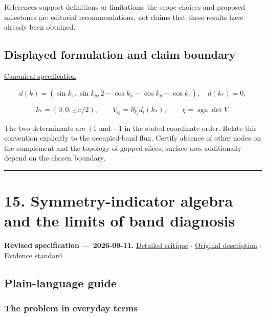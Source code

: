 \documentclass[
  11pt,
]{article}
\begin{document}
References support definitions or limitations; the scope choices and
proposed milestones are editorial recommendations, not claims that these
results have already been obtained.

\subsection{Displayed formulation and claim boundary}

\href{https://github.com/rick-stevens-ai/Pure-Thought/blob/main/PRDs/14-Topological-Semimetals-Weyl-Dirac.md}{Canonical
specification}.

\[d(k)=(\sin k_x,\sin k_y,2-\cos k_x-\cos k_y-\cos k_z),
\quad d(k_*)=0,\]

\[k_*=(0,0,\pm\pi/2),\qquad
V_{ij}=\partial_{k_j}d_i(k_*),\qquad \chi=\operatorname{sgn}\det V.\]

The two determinants are \(+1\) and \(-1\) in the stated coordinate
order. Relate this convention explicitly to the occupied-band flux.
Certify absence of other nodes on the complement and the topology of
gapped slices; surface arcs additionally depend on the chosen boundary.

\begin{center}\rule{0.5\linewidth}{0.5pt}\end{center}

\section{15. Symmetry-indicator algebra and the limits of band
diagnosis}

\textbf{Revised specification --- 2026-09-11.}
\href{https://github.com/rick-stevens-ai/Pure-Thought/blob/main/reviews/15-Topological-Quantum-Chemistry.md}{Detailed
critique} \ensuremath{\cdot}
\href{https://github.com/rick-stevens-ai/Pure-Thought/blob/main/archive/original-PRDs/15-Topological-Quantum-Chemistry.md}{Original
description} \ensuremath{\cdot}
\href{https://github.com/rick-stevens-ai/Pure-Thought/blob/main/reviews/EVIDENCE-STANDARD.md}{Evidence
standard}

\subsection{Plain-language guide}

\subsubsection{The problem in everyday terms}
\end{document}
